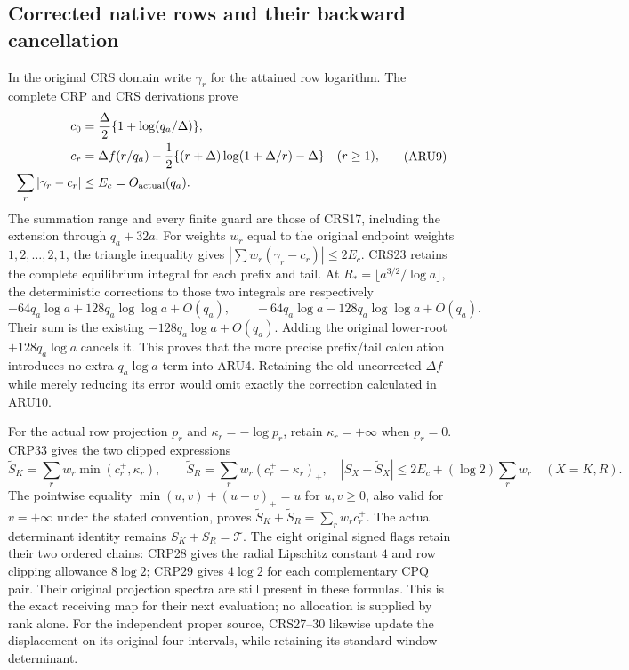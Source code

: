 \subsection{Corrected native rows and their backward cancellation}
In the original CRS domain write $\gamma_r$ for the attained row
logarithm. The complete CRP and CRS derivations prove
\[
\begin{split}
 c_0&=\frac\Delta2\{1+\log(q_a/\Delta)\},\\
 c_r&=\Delta f(r/q_a)-\frac12
       \{(r+\Delta)\log(1+\Delta/r)-\Delta\}\quad(r\ge1),\\
 \sum_r|\gamma_r-c_r|&\le E_c=O_{\rm actual}(q_a).
\end{split}\tag{ARU9}
\]
The summation range and every finite guard are those of CRS17,
including the extension through $q_a+32a$. For weights $w_r$ equal
to the original endpoint weights $1,2,\ldots,2,1$, the triangle
inequality gives $|\sum w_r(\gamma_r-c_r)|\le2E_c$.
CRS23 retains the complete equilibrium integral for each prefix and
tail. At $R_*=\lfloor a^{3/2}/\log a\rfloor$, the deterministic
corrections to those two integrals are respectively
\[
 -64q_a\log a+128q_a\log\log a+O(q_a),\qquad
 -64q_a\log a-128q_a\log\log a+O(q_a).
 \tag{ARU10}
\]
Their sum is the existing $-128q_a\log a+O(q_a)$. Adding the
original lower-root $+128q_a\log a$ cancels it. This proves that the
more precise prefix/tail calculation introduces no extra
$q_a\log a$ term into ARU4. Retaining the old uncorrected
$\Delta f$ while merely reducing its error would omit exactly
the correction calculated in ARU10.

For the actual row projection $p_r$ and
$\kappa_r=-\log p_r$, retain $\kappa_r=+\infty$ when $p_r=0$.
CRP33 gives the two clipped expressions
\[
 \widetilde S_K=\sum_r w_r\min(c_r^+,\kappa_r),\qquad
 \widetilde S_R=\sum_r w_r(c_r^+-\kappa_r)_+,
 \quad |S_X-\widetilde S_X|
 \le2E_c+(\log2)\sum_r w_r\quad(X=K,R).
 \tag{ARU11}
\]
The pointwise equality
$\min(u,v)+(u-v)_+=u$ for $u,v\ge0$, also valid for $v=+\infty$
under the stated convention, proves
$\widetilde S_K+\widetilde S_R=\sum_rw_rc_r^+$.
The actual determinant identity remains $S_K+S_R=\mathcal T$.
The eight original signed flags retain their two ordered chains:
CRP28 gives the radial Lipschitz constant $4$ and row clipping
allowance $8\log2$; CRP29 gives $4\log2$ for each complementary
CPQ pair. Their original projection spectra are still present
in these formulas. This is the exact receiving map for their
next evaluation; no allocation is supplied by rank alone.
For the independent proper source, CRS27--30 likewise update
the displacement on its original four intervals, while retaining
its standard-window determinant.

